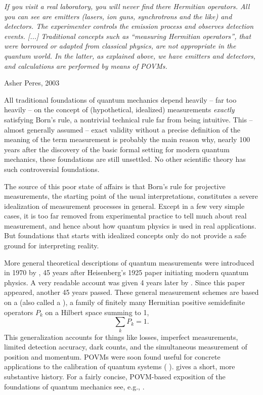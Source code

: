 \documentclass[12pt]{article}
\begin{document}
\bigskip


\nopagebreak
\hfill\parbox[t]{10.8cm}{\footnotesize

{\em
If you visit a real laboratory, you will never find there Hermitian
operators. All you can see are emitters (lasers, ion guns, synchrotrons
and the like) and detectors. The experimenter controls the emission
process and observes detection events. [...]
Traditional concepts such as ``measuring Hermitian operators'', that
were borrowed or adapted from classical physics, are not appropriate
in the quantum world. In the latter, as explained above, we have
emitters and detectors, and calculations are performed by means of
POVMs.}

\hfill Asher Peres, 2003 \cite[p.1545f]{Per2003}
}

\bigskip

All traditional foundations of quantum mechanics depend heavily  -- far
too heavily -- on the concept of (hypothetical, idealized) measurements
{\em exactly} satisfying Born's rule, a nontrivial technical rule far
from being intuitive. This -- almost generally assumed -- exact validity
without a precise definition of the meaning of the term measurement
is probably the main reason why, nearly 100 years after the discovery
of the basic formal setting for modern quantum mechanics, these
foundations are still unsettled. No other scientific theory has such
controversial foundations.

The source of this poor state of affairs is that Born's rule for
projective measurements, the starting point of the usual
interpretations, constitutes a severe idealization of measurement 
processes in general. Except in a few very simple cases, it is too far 
removed from experimental practice to tell much about real measurement, 
and hence about how quantum physics is used in real applications. But 
foundations that starts with idealized concepts only do not provide a 
safe ground for interpreting reality. 

More general theoretical descriptions of quantum measurements were
introduced in 1970 by  \cite{DavL}, 45 years after
Heisenberg's 1925 paper initiating modern quantum physics.  A very
readable account was given 4 years later by 
\cite{AliE.meas}. Since this paper appeared, another 45 years passed.
These general measurement schemes are based on a 
(also called a ),
a family of finitely many Hermitian positive semidefinite operators
$P_k$ on a Hilbert space summing to 1,
\[
\sum_k P_k=1.
\]
This generalization accounts for things like losses, imperfect
measurements, limited detection accuracy, dark counts, and the
simultaneous measurement of position and momentum. POVMs were soon found
useful for concrete applications to the calibration of quantum systems
( \cite{Hel}).  \cite{Bra} gives a short,
more substantive history. For a fairly concise, POVM-based
exposition of the foundations of quantum mechanics see, e.g.,
 \cite{Eng}.
\end{document}
